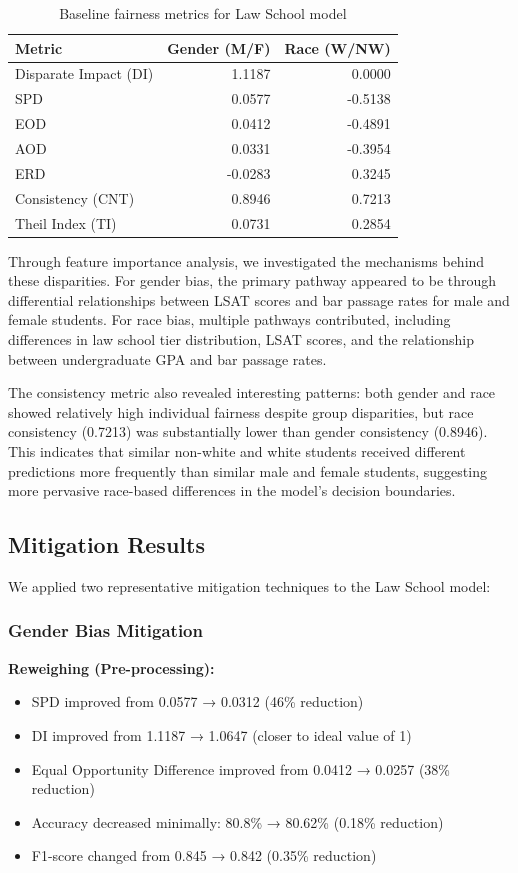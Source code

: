 \documentclass[10pt,journal,compsoc]{IEEEtran}
\begin{document}
\begin{table}[!t]
\caption{Baseline fairness metrics for Law School model}
\label{table:baseline}
\centering
\begin{tabular}{|l|r|r|}
\hline
\textbf{Metric} & \textbf{Gender (M/F)} & \textbf{Race (W/NW)} \\
\hline
Disparate Impact (DI) & 1.1187 & 0.0000 \\
SPD & 0.0577 & -0.5138 \\
EOD & 0.0412 & -0.4891 \\
AOD & 0.0331 & -0.3954 \\
ERD & -0.0283 & 0.3245 \\
Consistency (CNT) & 0.8946 & 0.7213 \\
Theil Index (TI) & 0.0731 & 0.2854 \\
\hline
\end{tabular}
\end{table}

Through feature importance analysis, we investigated the mechanisms behind these disparities. For gender bias, the primary pathway appeared to be through differential relationships between LSAT scores and bar passage rates for male and female students. For race bias, multiple pathways contributed, including differences in law school tier distribution, LSAT scores, and the relationship between undergraduate GPA and bar passage rates.

The consistency metric also revealed interesting patterns: both gender and race showed relatively high individual fairness despite group disparities, but race consistency (0.7213) was substantially lower than gender consistency (0.8946). This indicates that similar non-white and white students received different predictions more frequently than similar male and female students, suggesting more pervasive race-based differences in the model's decision boundaries.

\subsection{Mitigation Results}
We applied two representative mitigation techniques to the Law School model:

\subsubsection{Gender Bias Mitigation}
\textbf{Reweighing (Pre-processing):}
\begin{itemize}
\item SPD improved from 0.0577 → 0.0312 (46\% reduction)
\item DI improved from 1.1187 → 1.0647 (closer to ideal value of 1)
\item Equal Opportunity Difference improved from 0.0412 → 0.0257 (38\% reduction)
\item Accuracy decreased minimally: 80.8\% → 80.62\% (0.18\% reduction)
\item F1-score changed from 0.845 → 0.842 (0.35\% reduction)
\end{itemize}
\end{document}
